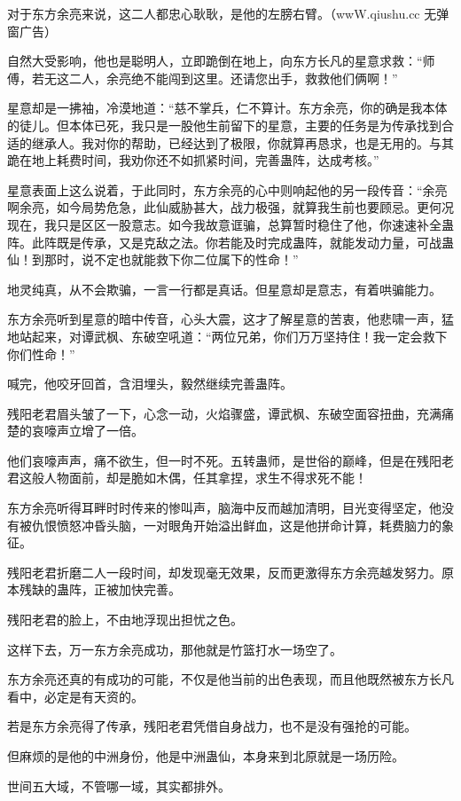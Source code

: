 \begin{this_body}
对于东方余亮来说，这二人都忠心耿耿，是他的左膀右臂。（wwW.qiushu.cc 无弹窗广告）

自然大受影响，他也是聪明人，立即跪倒在地上，向东方长凡的星意求救：“师傅，若无这二人，余亮绝不能闯到这里。还请您出手，救救他们俩啊！”

星意却是一拂袖，冷漠地道：“慈不掌兵，仁不算计。东方余亮，你的确是我本体的徒儿。但本体已死，我只是一股他生前留下的星意，主要的任务是为传承找到合适的继承人。我对你的帮助，已经达到了极限，你就算再恳求，也是无用的。与其跪在地上耗费时间，我劝你还不如抓紧时间，完善蛊阵，达成考核。”

星意表面上这么说着，于此同时，东方余亮的心中则响起他的另一段传音：“余亮啊余亮，如今局势危急，此仙威胁甚大，战力极强，就算我生前也要顾忌。更何况现在，我只是区区一股意志。如今我故意诓骗，总算暂时稳住了他，你速速补全蛊阵。此阵既是传承，又是克敌之法。你若能及时完成蛊阵，就能发动力量，可战蛊仙！到那时，说不定也就能救下你二位属下的性命！”

地灵纯真，从不会欺骗，一言一行都是真话。但星意却是意志，有着哄骗能力。

东方余亮听到星意的暗中传音，心头大震，这才了解星意的苦衷，他悲啸一声，猛地站起来，对谭武枫、东破空吼道：“两位兄弟，你们万万坚持住！我一定会救下你们性命！”

喊完，他咬牙回首，含泪埋头，毅然继续完善蛊阵。

残阳老君眉头皱了一下，心念一动，火焰骤盛，谭武枫、东破空面容扭曲，充满痛楚的哀嚎声立增了一倍。

他们哀嚎声声，痛不欲生，但一时不死。五转蛊师，是世俗的巅峰，但是在残阳老君这般人物面前，却是脆如木偶，任其拿捏，求生不得求死不能！

东方余亮听得耳畔时时传来的惨叫声，脑海中反而越加清明，目光变得坚定，他没有被仇恨愤怒冲昏头脑，一对眼角开始溢出鲜血，这是他拼命计算，耗费脑力的象征。

残阳老君折磨二人一段时间，却发现毫无效果，反而更激得东方余亮越发努力。原本残缺的蛊阵，正被加快完善。

残阳老君的脸上，不由地浮现出担忧之色。

这样下去，万一东方余亮成功，那他就是竹篮打水一场空了。

东方余亮还真的有成功的可能，不仅是他当前的出色表现，而且他既然被东方长凡看中，必定是有天资的。

若是东方余亮得了传承，残阳老君凭借自身战力，也不是没有强抢的可能。

但麻烦的是他的中洲身份，他是中洲蛊仙，本身来到北原就是一场历险。

世间五大域，不管哪一域，其实都排外。


\end{this_body}
